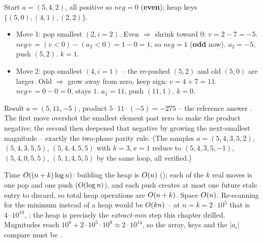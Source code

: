 \begin{tracebox}[Official sample -- n=3, k=2, x=7, array 5 4 2 (answer 5 11 -5)]
Start $a=(5,4,2)$, all positive so $\mathit{neg}=0$ (\textbf{even}); heap keys $\{(5,0),(4,1),(2,2)\}$.
\begin{itemize}[nosep,leftmargin=1.3em]
  \item Move 1: pop smallest $(2,i{=}2)$. Even $\Rightarrow$ shrink toward $0$: $v = 2-7 = -5$.
        $\mathit{neg} += (v{<}0)-(a_2{<}0) = 1-0 = 1$, so $\mathit{neg}=1$ (\textbf{odd} now). $a_2=-5$,
        push $(5,2)$. $k=1$. \checkmark
  \item Move 2: pop smallest $(4,i{=}1)$ -- the re-pushed $(5,2)$ and old $(5,0)$ are larger.
        Odd $\Rightarrow$ grow away from zero, keep sign: $v = 4+7 = 11$. $\mathit{neg} += 0-0 = 0$, stays
        $1$. $a_1=11$, push $(11,1)$. $k=0$. \checkmark
\end{itemize}
Result $a=(5,11,-5)$, product $5\cdot 11\cdot(-5) = -275$ -- the reference answer \checkmark. The first move
overshot the smallest element past zero to make the product negative; the second then deepened that negative
by growing the next-smallest magnitude -- exactly the two-phase parity rule. (The samples $a=(5,4,3,5,2)$,
$(5,4,3,5,5)$, $(5,4,4,5,5)$ with $k=3,x=1$ reduce to $(5,4,3,5,-1)$, $(5,4,0,5,5)$, $(5,1,4,5,5)$ by the
same loop, all verified.)
\end{tracebox}

\begin{complexitybox}
Time $O((n+k)\log n)$: building the heap is $O(n)$ (); each of the $k$ real moves
is one pop and one push ($O(\log n)$), and each push creates at most one future stale entry to discard,
so total heap operations are $O(n+k)$. Space $O(n)$. Re-scanning for the minimum instead of a heap
would be $O(kn)$ -- at $n=k=2\cdot10^{5}$ that is $4\cdot10^{10}$, \tle; the heap is precisely the
\emph{extract-min} step this chapter drilled. Magnitudes reach $10^{9}+2\cdot10^{5}\cdot10^{9}\approx
2\cdot10^{14}$, so the array, keys and the $|a_i|$ compare must be .
\end{complexitybox}

